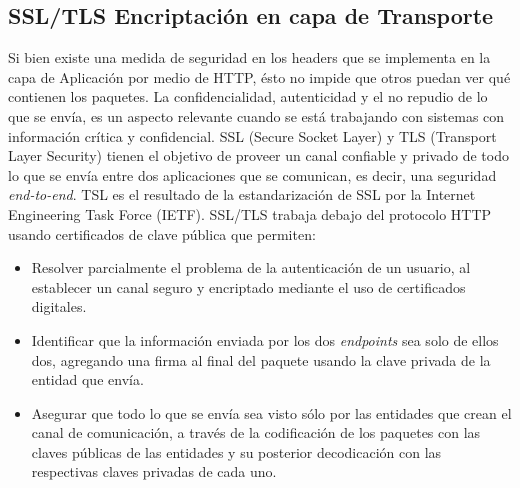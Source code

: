     \subsection{SSL/TLS Encriptación en capa de Transporte}
    Si bien existe una medida de seguridad en los headers que se implementa en la capa de Aplicación por medio de HTTP, ésto no impide que otros puedan ver qué contienen los paquetes. La confidencialidad, autenticidad y el no repudio de lo que se envía, es un aspecto relevante cuando se está trabajando con sistemas con información crítica y confidencial. SSL (Secure Socket Layer) y TLS (Transport Layer Security) \cite{RFC-5246} tienen el objetivo de proveer un canal confiable y privado de todo lo que se envía entre dos aplicaciones que se comunican, es decir, una seguridad \textit{end-to-end}. TSL es el resultado de la estandarización de SSL por la Internet Engineering Task Force (IETF). SSL/TLS trabaja debajo del protocolo HTTP usando certificados de clave pública que permiten:
    \begin{itemize}
        \item Resolver parcialmente el problema de la autenticación de un usuario, al establecer un canal seguro y encriptado mediante el uso de certificados digitales.
        \item Identificar que la información enviada por los dos \textit{endpoints} sea solo de ellos dos, agregando una firma al final del paquete usando la clave privada de la entidad que envía.
        \item Asegurar que todo lo que se envía sea visto sólo por las entidades que crean el canal de comunicación, a través de la codificación de los paquetes con las claves públicas de las entidades y su posterior decodicación con las respectivas claves privadas de cada uno.
    \end{itemize}

